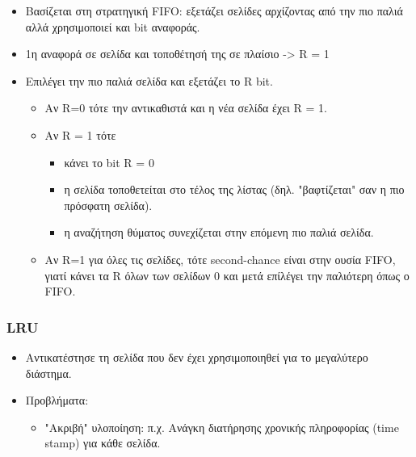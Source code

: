 \begin{itemize}
	\item	Βασίζεται στη στρατηγική FIFO: εξετάζει σελίδες αρχίζοντας
		από την πιο παλιά αλλά χρησιμοποιεί και bit αναφοράς.
	\item	1η αναφορά σε σελίδα και τοποθέτησή της σε πλαίσιο -> R = 1
	\item	Επιλέγει την πιο παλιά σελίδα και εξετάζει το R bit.
		\begin{itemize}
			\item	Αν R=0 τότε την αντικαθιστά και η νέα σελίδα έχει R = 1.
			\item	Αν R = 1 τότε
				\begin{itemize}
					\item	κάνει το bit R = 0
					\item	η σελίδα τοποθετείται στο τέλος της λίστας 
						(δηλ. "βαφτίζεται" σαν η πιο πρόσφατη σελίδα).
					\item	η αναζήτηση θύματος συνεχίζεται στην επόμενη πιο παλιά σελίδα.
				\end{itemize}
			\item	Αν R=1 για όλες τις σελίδες, τότε second-chance είναι στην ουσία FIFO, 
				γιατί κάνει τα R όλων των σελίδων 0 και μετά επίλέγει την παλιότερη όπως ο FIFO.
		\end{itemize}
\end{itemize}

\subsubsection{LRU}

\begin{itemize}
	\item	Αντικατέστησε τη σελίδα που δεν έχει χρησιμοποιηθεί για το μεγαλύτερο διάστημα.
	\item	Προβλήματα:
		\begin{itemize}
			\item	"Ακριβή" υλοποίηση: π.χ. Ανάγκη διατήρησης χρονικής πληροφορίας
				(time stamp) για κάθε σελίδα.
		\end{itemize}
\end{itemize}
